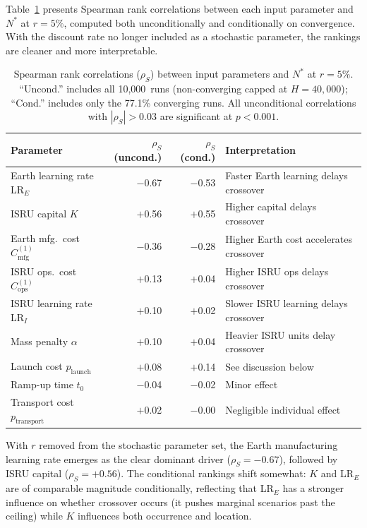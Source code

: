 \documentclass[preprint,12pt]{elsarticle}
\begin{document}
Table~\ref{tab:spearman} presents Spearman rank correlations between each input parameter and $N^*$ at $r = 5\%$, computed both unconditionally and conditionally on convergence. With the discount rate no longer included as a stochastic parameter, the rankings are cleaner and more interpretable.

\begin{table}[htbp]
\centering
\caption{Spearman rank correlations ($\rho_S$) between input parameters and $N^*$ at $r = 5\%$. ``Uncond.'' includes all 10{,}000~runs (non-converging capped at $H = 40{,}000$); ``Cond.'' includes only the 77.1\% converging runs. All unconditional correlations with $|\rho_S| > 0.03$ are significant at $p < 0.001$.}
\label{tab:spearman}
\begin{tabular}{@{}lrrl@{}}
\toprule
Parameter & $\rho_S$ (uncond.) & $\rho_S$ (cond.) & Interpretation \\
\midrule
Earth learning rate LR$_E$     & $-$0.67 & $-$0.53 & Faster Earth learning delays crossover \\
ISRU capital $K$               & $+$0.56 & $+$0.55 & Higher capital delays crossover \\
Earth mfg.\ cost $C_{\mathrm{mfg}}^{(1)}$ & $-$0.36 & $-$0.28 & Higher Earth cost accelerates crossover \\
ISRU ops.\ cost $C_{\mathrm{ops}}^{(1)}$ & $+$0.13 & $+$0.04 & Higher ISRU ops delays crossover \\
ISRU learning rate LR$_I$      & $+$0.10 & $+$0.02 & Slower ISRU learning delays crossover \\
Mass penalty $\alpha$          & $+$0.10 & $+$0.04 & Heavier ISRU units delay crossover \\
Launch cost $p_{\mathrm{launch}}$   & $+$0.08 & $+$0.14 & See discussion below \\
Ramp-up time $t_0$             & $-$0.04 & $-$0.02 & Minor effect \\
Transport cost $p_{\mathrm{transport}}$ & $+$0.02 & $-$0.00 & Negligible individual effect \\
\bottomrule
\end{tabular}
\end{table}

With $r$ removed from the stochastic parameter set, the Earth manufacturing learning rate emerges as the clear dominant driver ($\rho_S = -0.67$), followed by ISRU capital ($\rho_S = +0.56$). The conditional rankings shift somewhat: $K$ and LR$_E$ are of comparable magnitude conditionally, reflecting that LR$_E$ has a stronger influence on whether crossover occurs (it pushes marginal scenarios past the ceiling) while $K$ influences both occurrence and location.
\end{document}
